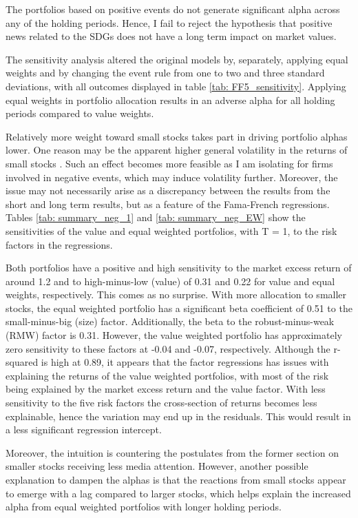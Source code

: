 The portfolios based on positive events do not generate significant alpha across any of the holding periods. Hence, I fail to reject the hypothesis that positive news related to the SDGs does not have a long term impact on market values. 

The sensitivity analysis altered the original models by, separately, applying equal weights and by changing the event rule from one to two and three standard deviations, with all outcomes displayed in table \ref{tab: FF5_sensitivity}. Applying equal weights in portfolio allocation results in an adverse alpha for all holding periods compared to value weights. 

Relatively more weight toward small stocks takes part in driving portfolio alphas lower. One reason may be the apparent higher general volatility in the returns of small stocks \citep{Fama_french_3fac}. Such an effect becomes more feasible as I am isolating for firms involved in negative events, which may induce volatility further. Moreover, the issue may not necessarily arise as a discrepancy between the results from the short and long term results, but as a feature of the Fama-French regressions. Tables \ref{tab: summary_neg_1} and \ref{tab: summary_neg_EW} show the sensitivities of the value and equal weighted portfolios, with T = 1, to the risk factors in the regressions. 

Both portfolios have a positive and high sensitivity to the market excess return of around 1.2 and to high-minus-low (value) of 0.31 and 0.22 for value and equal weights, respectively. This comes as no surprise. With more allocation to smaller stocks, the equal weighted portfolio has a significant beta coefficient of 0.51 to the small-minus-big (size) factor. Additionally, the beta to the robust-minus-weak (RMW) factor is 0.31. However, the value weighted portfolio has approximately zero sensitivity to these factors at -0.04 and -0.07, respectively. Although the r-squared is high at 0.89, it appears that the factor regressions has issues with explaining the returns of the value weighted portfolios, with most of the risk being explained by the market excess return and the value factor. With less sensitivity to the five risk factors the cross-section of returns becomes less explainable, hence the variation may end up in the residuals. This would result in a less significant regression intercept.  

Moreover, the intuition is countering the postulates from the former section on smaller stocks receiving less media attention. However, another possible explanation to dampen the alphas is that the reactions from small stocks appear to emerge with a lag compared to larger stocks, which helps explain the increased alpha from equal weighted portfolios with longer holding periods. 


